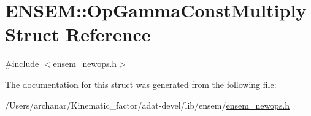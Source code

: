 \hypertarget{structENSEM_1_1OpGammaConstMultiply}{}\section{E\+N\+S\+EM\+:\+:Op\+Gamma\+Const\+Multiply Struct Reference}
\label{structENSEM_1_1OpGammaConstMultiply}


{\ttfamily \#include $<$ensem\+\_\+newops.\+h$>$}



The documentation for this struct was generated from the following file\+:\begin{DoxyCompactItemize}
\item 
/\+Users/archanar/\+Kinematic\+\_\+factor/adat-\/devel/lib/ensem/\mbox{\hyperlink{adat-devel_2lib_2ensem_2ensem__newops_8h}{ensem\+\_\+newops.\+h}}\end{DoxyCompactItemize}
